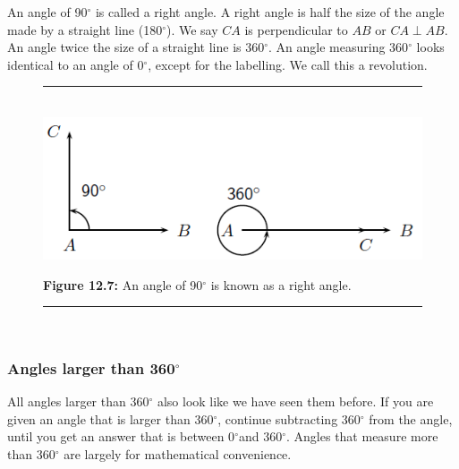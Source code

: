 
\par
An angle of 90$^{\circ }$ is called a right angle. A right angle is half the size of the angle made by a straight line (180$^{\circ }$). We say $CA$ is perpendicular to $AB$ or $CA\perp AB$. An angle twice the size of a straight line is 360$^{\circ }$. An angle measuring 360$^{\circ }$ looks identical to an angle of 0$^{\circ }$, except for the labelling. We call this a revolution.\par 
\setcounter{subfigure}{0}
\begin{figure}[H] %
\begin{center}
\rule[.1in]{\figurerulewidth}{.005in} \\
\label{m39370*uid18!!!underscore!!!media}\label{m39370*uid18!!!underscore!!!printimage}\includegraphics[width=.8\columnwidth]{col11306.imgs/m39370_MG10C13_007.png} %
\vspace{2pt}
\vspace{\rubberspace}\par \begin{cnxcaption}
\small \textbf{Figure 12.7: }An angle of 90$^{\circ }$ is known as a right angle.
\end{cnxcaption}
\vspace{.1in}
\rule[.1in]{\figurerulewidth}{.005in} \\
\end{center}
\end{figure}       

\subsubsection{  Angles larger than 360$^{\circ }$ }
\nopagebreak
All angles larger than 360$^{\circ }$ also look like we have seen them before. If you are given an angle that is larger than 360$^{\circ }$, continue subtracting 360$^{\circ }$ from the angle, until you get an answer that is between 0$^{\circ }$and 360$^{\circ }$. Angles that measure more than 360$^{\circ }$ are largely for mathematical convenience. \par 

